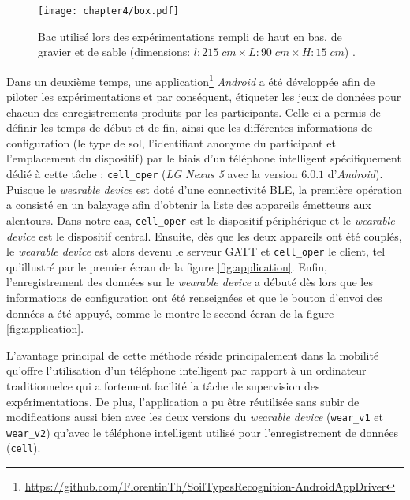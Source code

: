 \begin{figure}[H]
	\centering
	\texttt{[image: chapter4/box.pdf]}
        \caption[Bac utilisé lors des expérimentations rempli de haut en bas, de gravier et de sable (dimensions: $l : 215\; cm \times L : 90\; cm \times H : 15\; cm$).]{Bac utilisé lors des expérimentations rempli de haut en bas, de gravier et de sable (dimensions: $l : 215\; cm \times L : 90\; cm \times H : 15\; cm$) \citep{Thullier2017}.}
	\label{fig:box}
\end{figure}

Dans un deuxième temps, une application\footnote{\url{https://github.com/FlorentinTh/SoilTypesRecognition-AndroidAppDriver}} \textit{Android} a été développée afin de piloter les expérimentations et par conséquent, étiqueter les jeux de données pour chacun des enregistrements produits par les participants. Celle-ci a permis de définir les temps de début et de fin, ainsi que les différentes informations de configuration (le type de sol, l'identifiant anonyme du participant et l'emplacement du dispositif) par le biais d'un téléphone intelligent spécifiquement dédié à cette tâche : \texttt{cell\_oper} (\textit{LG Nexus 5} avec la version $6.0.1$ d'\textit{Android}). Puisque le \textit{wearable device} est doté d'une connectivité \acs{BLE}, la première opération a consisté en un balayage afin d'obtenir la liste des appareils émetteurs aux alentours. Dans notre cas, \texttt{cell\_oper} est le dispositif périphérique et le \textit{wearable device} est le dispositif central. Ensuite, dès que les deux appareils ont été couplés, le \textit{wearable device} est alors devenu le serveur \acs{GATT} et \texttt{cell\_oper} le client, tel qu'illustré par le premier écran de la figure \ref{fig:application}. Enfin, l'enregistrement des données sur le \textit{wearable device} a débuté dès lors que les informations de configuration ont été renseignées et que le bouton d'envoi des données a été appuyé, comme le montre le second écran de la figure \ref{fig:application}.

L'avantage principal de cette méthode réside principalement dans la mobilité qu'offre l'utilisation d'un téléphone intelligent par rapport à un ordinateur traditionnel\textemdash ce qui a fortement facilité la tâche de supervision des expérimentations. De plus, l'application a pu être réutilisée sans subir de modifications aussi bien avec les deux versions du \textit{wearable device} (\texttt{wear\_v1} et \texttt{wear\_v2}) qu'avec le téléphone intelligent utilisé pour l'enregistrement de données (\texttt{cell}).

